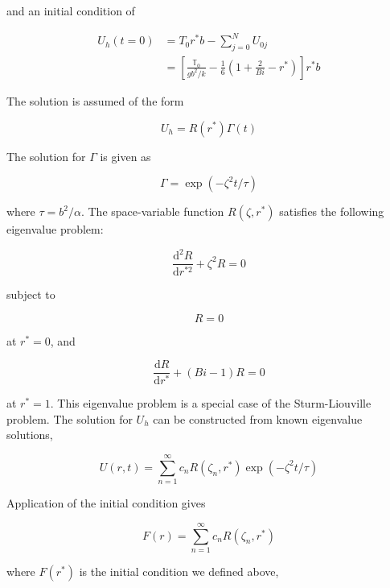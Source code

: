 and an initial condition of

\begin{align}
    U_h(t=0) &= T_0r^*b - \sum_{j=0}^N U_{0j}\\
    & = \left[\frac{\mathbb{T}_0}{gb^2/k} - \frac{1}{6}\left(1 + \frac{2}{Bi} - r^*\right)\right]r^*b
\end{align}


The solution is assumed of the form

\begin{equation}
    U_h = R(r^*) \Gamma(t)
\end{equation}

The solution for $\Gamma$ is given as

\begin{equation}
    \Gamma = \exp(-\zeta^2t/\tau)
\end{equation}

where $\tau = b^2/\alpha$. The space-variable function $R(\zeta,r^*)$ satisfies the following eigenvalue problem:

\begin{equation}\label{eq:eigen-function}
    \frac{\mathrm{d}^2R}{\mathrm{d}r^{*2}} + \zeta^2 R = 0
\end{equation}

subject to 

\begin{equation}
    R = 0
\end{equation}

at $r^* = 0$, and

\begin{equation}
    \frac{\mathrm{d}R}{\mathrm{d}r^*} + (Bi - 1)R = 0
\end{equation}

at $r^* = 1$. This eigenvalue problem is a special case of the Sturm-Liouville problem. The solution for $U_h$ can be constructed from known eigenvalue solutions,

\begin{equation}\label{eq:eigen-general-solution}
    U(r,t) = \sum_{n=1}^\infty c_n R(\zeta_n,r^*)\exp(-\zeta^2 t/\tau)
\end{equation}

Application of the initial condition gives

\begin{equation}\label{eq:eigen-initial-condition}
    F(r) = \sum_{n=1}^\infty c_n R(\zeta_n,r^*)
\end{equation}

where $F(r^*)$ is the initial condition we defined above, 

